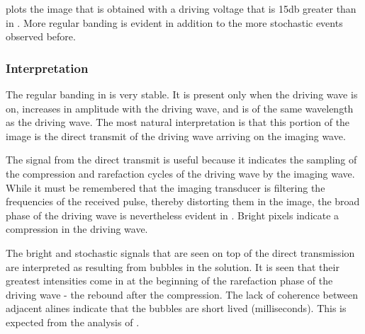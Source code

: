 



  plots the image that is obtained with a driving voltage that is 15db greater than in .
More regular banding is evident in addition to the more stochastic events observed before.

\subsubsection{Interpretation}

The regular banding in  is very stable.
It is present only when the driving wave is on, increases in amplitude with the driving wave,
and is of the same wavelength as the driving wave.
The most natural interpretation is that this portion of the image is the 
direct transmit of the driving wave arriving on the imaging wave.

The signal from the direct transmit is useful because it indicates the sampling of the compression
and rarefaction cycles of the driving wave by the imaging wave.
While it must be remembered that the imaging transducer is filtering the frequencies of the received pulse,
thereby distorting them in the image, 
the broad phase of the driving wave is nevertheless evident in .
Bright pixels indicate a compression in the driving wave.

The bright and stochastic signals that are seen on top of the direct transmission 
are interpreted as resulting from bubbles in the solution.
It is seen that their greatest intensities come in at the beginning of the rarefaction phase of the driving wave - the rebound after the compression. 
The lack of coherence between adjacent alines indicate that the bubbles are short lived (milliseconds).
This is expected from the analysis of .

